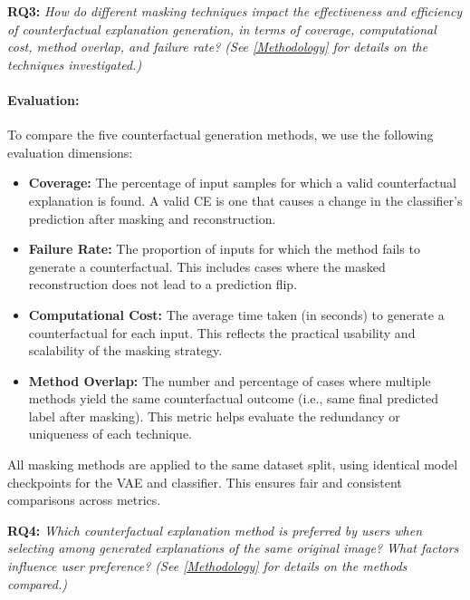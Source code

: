\vspace{1em}
    
\textbf{RQ3:} \textit{How do different masking techniques impact the effectiveness and efficiency of counterfactual explanation generation, in terms of coverage, computational cost, method overlap, and failure rate? (See \cref{Methodology} for details on the techniques investigated.)}

\vspace{-1em}



\paragraph{Evaluation:} To compare the five counterfactual generation methods, we use the following evaluation dimensions:
    \begin{itemize} 
        \item \textbf{Coverage:} The percentage of input samples for which a valid counterfactual explanation is found. A valid CE is one that causes a change in the classifier's prediction after masking and reconstruction.
        
        \item \textbf{Failure Rate:} The proportion of inputs for which the method fails to generate a counterfactual. This includes cases where the masked reconstruction does not lead to a prediction flip.
    
        \item \textbf{Computational Cost:} The average time taken (in seconds) to generate a counterfactual for each input. This reflects the practical usability and scalability of the masking strategy.
    
        \item \textbf{Method Overlap:} The number and percentage of cases where multiple methods yield the same counterfactual outcome (i.e., same final predicted label after masking). This metric helps evaluate the redundancy or uniqueness of each technique.

    \end{itemize}

    All masking methods are applied to the same dataset split, using identical model checkpoints for the VAE and classifier. This ensures fair and consistent comparisons across metrics.

\vspace{1em}

\textbf{RQ4:} \textit{ Which counterfactual explanation method is preferred by users when selecting among generated explanations of the same original image? What factors influence user preference? (See \cref{Methodology} for details on the methods compared.)}

